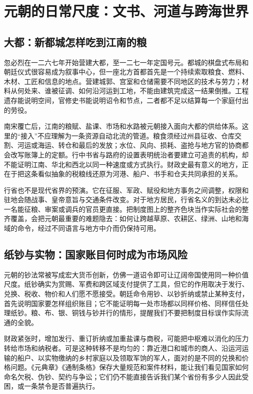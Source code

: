 \section{元朝的日常尺度：文书、河道与跨海世界}

\subsection{大都：新都城怎样吃到江南的粮}

忽必烈在一二六七年开始营建大都，至一二七一年定国号元。都城的棋盘式布局和朝廷仪式很容易成为叙事中心，但一座北方首都首先是一个持续索取粮食、燃料、木材、工匠和信息的地点。营建城郭、宫室和仓储需要不同地区的技术与劳力；材料从何处来、谁被征调、如何沿河运到工地，不能由建筑完成这一结果倒推。工程遗存能说明空间，官修史书能说明诏令和节点，二者都不足以结算每一个家庭付出的劳役。

南宋覆亡后，江南的粮赋、盐课、市场和水路被元朝接入面向大都的供给体系。这里的“接入”不应理解为一条资源自动北流的管道。粮食须经过州县征收、仓库交割、河运或海运、转仓和最后的发放；水位、风向、损耗、盗抢与地方官的协商都会改写账簿上的定额。行中书省与路府的设置表明统治者要建立可追责的机构，却不能证明江南、华北和西北以同一种速度或方式执行。财政史最有意义的地方，正在于把这条看似抽象的税粮线还原为河港、船户、书手和仓夫共同承担的关系。

行省也不是现代省界的预演。它在征服、军政、赋役和地方事务之间调整，权限和驻地会随战事、皇帝意旨与交通条件改变。对于地方居民，行省名义的到达未必比一名能征粮、审案或调兵的官员更直接。把制度图上的整齐色块当作实际社会的整齐覆盖，会把元朝最重要的难题隐去：如何让跨越草原、农耕区、绿洲、山地和海域的命令，经过不同语言与地方中介而仍保持可用。

\subsection{纸钞与实物：国家账目何时成为市场风险}

元朝的钞法常被写成宏大货币创新，仿佛一道诏令即可让辽阔帝国使用同一种价值尺度。纸钞确实为赏赐、军费和跨区域支付提供了工具，但它的作用取决于发行、兑换、税收、物价和人们愿不愿接受。朝廷命令用钞、以钞折纳或禁止某种支付，首先说明国家要怎样组织账目；它不能证明每一处市场都以同样价格、同样信任处理纸钞。粮、布、银、铜钱与钞并行的情形，提醒我们不要把制度目标误作实际流通的全貌。

财政紧张时，增加发行、重订折纳或加重盐课与商税，可能把中枢难以消化的压力转给市场和纳税者。可是这种转移不是均匀的：靠近港口和城市的商人、沿运河运输的船户、以实物缴纳的乡村家庭以及领取军饷的军人，面对的是不同的兑换和价格问题。《元典章》《通制条格》保存大量规范和案件材料，能让我们看见国家如何命名欠税、伪钞、契约与争讼；它们仍不能直接告诉我们某个省份有多少人因此受困，或一条禁令是否普遍执行。


